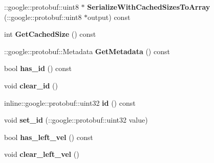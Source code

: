 \begin{DoxyCompactItemize}
\item 
\+::google\+::protobuf\+::uint8 $\ast$ {\bfseries Serialize\+With\+Cached\+Sizes\+To\+Array} (\+::google\+::protobuf\+::uint8 $\ast$output) const \hypertarget{classvss__command_1_1Robot__Command_ab3447c593d9b6135979822bad4903648}{}\label{classvss__command_1_1Robot__Command_ab3447c593d9b6135979822bad4903648}

\item 
int {\bfseries Get\+Cached\+Size} () const \hypertarget{classvss__command_1_1Robot__Command_a45dc66dc5c38e988073141707b083dae}{}\label{classvss__command_1_1Robot__Command_a45dc66dc5c38e988073141707b083dae}

\item 
\+::google\+::protobuf\+::\+Metadata {\bfseries Get\+Metadata} () const \hypertarget{classvss__command_1_1Robot__Command_a5383c49b5b6ef83dc3b9ac3ab2dd870a}{}\label{classvss__command_1_1Robot__Command_a5383c49b5b6ef83dc3b9ac3ab2dd870a}

\item 
bool {\bfseries has\+\_\+id} () const \hypertarget{classvss__command_1_1Robot__Command_ab636015fe88af27ccaf824159805442d}{}\label{classvss__command_1_1Robot__Command_ab636015fe88af27ccaf824159805442d}

\item 
void {\bfseries clear\+\_\+id} ()\hypertarget{classvss__command_1_1Robot__Command_a0b684f61267d6e251f068f1b2a4c772f}{}\label{classvss__command_1_1Robot__Command_a0b684f61267d6e251f068f1b2a4c772f}

\item 
inline\+::google\+::protobuf\+::uint32 {\bfseries id} () const \hypertarget{classvss__command_1_1Robot__Command_a632b1e7c37152ca3ecca6e45547faa94}{}\label{classvss__command_1_1Robot__Command_a632b1e7c37152ca3ecca6e45547faa94}

\item 
void {\bfseries set\+\_\+id} (\+::google\+::protobuf\+::uint32 value)\hypertarget{classvss__command_1_1Robot__Command_a7aa38699c29bd2037112084fbb833efe}{}\label{classvss__command_1_1Robot__Command_a7aa38699c29bd2037112084fbb833efe}

\item 
bool {\bfseries has\+\_\+left\+\_\+vel} () const \hypertarget{classvss__command_1_1Robot__Command_aba5afdfa1c9844cbea2b8b5c1f9a3a71}{}\label{classvss__command_1_1Robot__Command_aba5afdfa1c9844cbea2b8b5c1f9a3a71}

\item 
void {\bfseries clear\+\_\+left\+\_\+vel} ()\hypertarget{classvss__command_1_1Robot__Command_a728166b3b1a62583a6e46545b5ad44c7}{}\label{classvss__command_1_1Robot__Command_a728166b3b1a62583a6e46545b5ad44c7}


\end{DoxyCompactItemize}
